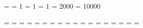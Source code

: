 \tolerance = \pretolerance      %
\tracinglostchars = 1           %
\tracingstats = 1               %
\uchyph = 1                     %
\vbadness = 2000                %
\widowpenalty = 10000           %


\setflag \allowcolor = \true            %
\setflag \allowreftitle = \false        %
\setflag \baselinetoprules = \true      %
\setflag \DVIWindoinuse = \false        %
\setflag \DVIWindorules = \false        %
\setflag \forceepsbb = \false           %
\setflag \indexcites = \false           %
\setflag \newbiblio = \false            %
\setflag \newdots = \false              %
\setflag \newrunners = \false           %
\setflag \newtabular = \false           %
\setflag \newtitleadjustment = \false   %
\setflag \PDFhyperlinks = \false        %
\setflag \raggedbottom = \false         %
\setflag \risingbottomfloats = \false   %
\setflag \risingfootnotes = \false      %
\setflag \topdeltaadjustment = \false   %
\setflag \zcommonencoding = \false      %


